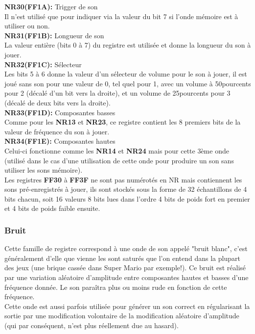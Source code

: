 \documentclass{report}
\begin{document}
	\textbf{NR30(FF1A):} Trigger de son \\ 
		Il n'est utilisé que pour indiquer via la
		valeur du bit 7 si l'onde mémoire est à utiliser ou
		non.\\
		
	\textbf{NR31(FF1B):} Longueur de son \\
		La valeur entière (bits 0 à 7) du
		registre est utilisée et donne la longueur du son à
		jouer.\\ 
		
	\textbf{NR32(FF1C):} Sélecteur \\
		Les bits 5 à 6 donne la valeur d'un
		sélecteur de volume pour le son à jouer, il est joué
		sans son pour une valeur de 0, tel quel pour 1, avec un volume à 50pourcents 
		pour 2 (décalé d'un bit vers la droite), et un volume
		de 25pourcents pour 3 (décalé de deux bits vers la droite). \\
		
	\textbf{NR33(FF1D):} Composantes basses \\
		Comme pour les \textbf{NR13} et \textbf{NR23}, ce registre
		contient les 8 premiers bits de la valeur de fréquence
		du son à jouer.\\

	\textbf{NR34(FF1E):} Composantes hautes \\
		Celui-ci fonctionne comme les \textbf{NR14} et \textbf{NR24} mais pour
		cette 3ème onde (utilisé dans le cas d'une utilisation
		de cette onde pour produire un son sans utiliser les
		sons mémoire). \\

	Les registres \textbf{FF30} à \textbf{FF3F} ne sont pas numérotés en NR
		mais contiennent les sons pré-enregistrés à jouer, ils
		sont stockés sous la forme de 32 échantillons de 4
		bits chacun, soit 16 valeurs 8 bits lues dans l'ordre
		4 bits de poids fort en premier et 4 bits de poids
		faible ensuite.

	\subsubsection{Bruit}
		Cette famille de registre correspond à une onde de son
		appelé "bruit blanc", c'est généralement d'elle que
		vienne les sont saturés que l'on entend dans la
		plupart des jeux (une brique cassée dans Super Mario
		par exemple!). 
		Ce bruit est réalisé par une variation aléatoire
		d'amplitude entre composantes hautes et basses d'une
		fréquence donnée. Le son paraîtra plus ou moins rude
		en fonction de cette fréquence. \\
		Cette onde est aussi parfois utilisée pour générer un
		son correct en régularisant la sortie par une
		modification volontaire de la modification aléatoire
		d'amplitude (qui par conséquent, n'est plus réellement
		due au hasard). \\
\end{document}
